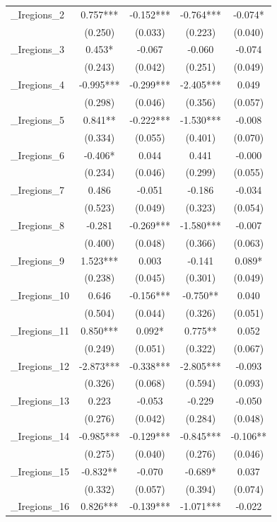 \documentclass[]{article}
\begin{document}
\begin{tabular}{lcccc}
\_Iregions\_2 & 0.757*** & -0.152*** & -0.764*** & -0.074* \\
 & (0.250) & (0.033) & (0.223) & (0.040) \\
\_Iregions\_3 & 0.453* & -0.067 & -0.060 & -0.074 \\
 & (0.243) & (0.042) & (0.251) & (0.049) \\
\_Iregions\_4 & -0.995*** & -0.299*** & -2.405*** & 0.049 \\
 & (0.298) & (0.046) & (0.356) & (0.057) \\
\_Iregions\_5 & 0.841** & -0.222*** & -1.530*** & -0.008 \\
 & (0.334) & (0.055) & (0.401) & (0.070) \\
\_Iregions\_6 & -0.406* & 0.044 & 0.441 & -0.000 \\
 & (0.234) & (0.046) & (0.299) & (0.055) \\
\_Iregions\_7 & 0.486 & -0.051 & -0.186 & -0.034 \\
 & (0.523) & (0.049) & (0.323) & (0.054) \\
\_Iregions\_8 & -0.281 & -0.269*** & -1.580*** & -0.007 \\
 & (0.400) & (0.048) & (0.366) & (0.063) \\
\_Iregions\_9 & 1.523*** & 0.003 & -0.141 & 0.089* \\
 & (0.238) & (0.045) & (0.301) & (0.049) \\
\_Iregions\_10 & 0.646 & -0.156*** & -0.750** & 0.040 \\
 & (0.504) & (0.044) & (0.326) & (0.051) \\
\_Iregions\_11 & 0.850*** & 0.092* & 0.775** & 0.052 \\
 & (0.249) & (0.051) & (0.322) & (0.067) \\
\_Iregions\_12 & -2.873*** & -0.338*** & -2.805*** & -0.093 \\
 & (0.326) & (0.068) & (0.594) & (0.093) \\
\_Iregions\_13 & 0.223 & -0.053 & -0.229 & -0.050 \\
 & (0.276) & (0.042) & (0.284) & (0.048) \\
\_Iregions\_14 & -0.985*** & -0.129*** & -0.845*** & -0.106** \\
 & (0.275) & (0.040) & (0.276) & (0.046) \\
\_Iregions\_15 & -0.832** & -0.070 & -0.689* & 0.037 \\
 & (0.332) & (0.057) & (0.394) & (0.074) \\
\_Iregions\_16 & 0.826*** & -0.139*** & -1.071*** & -0.022 \\

\end{tabular}
\end{document}
